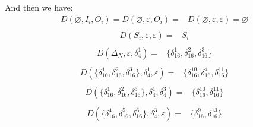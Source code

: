 \documentclass[conference]{IEEEtran} %
\begin{document}
And then we have:
\begin{equation}
\begin{split}
D\left(\varnothing,I_i,O_i\right)=D\left(\varnothing,\varepsilon,O_i\right)=&D\left(\varnothing,\varepsilon,\varepsilon\right)=\varnothing\\
\end{split}
\label{equ:7}
\end{equation}
\begin{equation}
\begin{split}
D\left(S_i,\varepsilon,\varepsilon\right)=&S_i\\
\end{split}
\label{equ:8}
\end{equation}
\begin{equation}
\begin{split}
D\left(\Delta_N,\varepsilon,\delta_4^1\right)=&\{\delta_{16}^1,\delta_{16}^2,\delta_{16}^3\}\\
\end{split}
\label{equ:9}
\end{equation}
\begin{equation}
\begin{split}
D\left(\{\delta_{16}^1,\delta_{16}^2,\delta_{16}^3\},\delta_4^1,\varepsilon\right)=&\{\delta_{16}^{10},\delta_{16}^4,\delta_{16}^{11}\}\\
\end{split}
\label{equ:10}
\end{equation}
\begin{equation}
\begin{split}
D\left(\{\delta_{16}^1,\delta_{16}^2,\delta_{16}^3\},\delta_4^1,\delta_4^3\right)=&\{\delta_{16}^{10},\delta_{16}^{11}\}\\
\end{split}
\label{equ:11}
\end{equation}
\begin{equation}
\begin{split}
D\left(\{\delta_{16}^4,\delta_{16}^5,\delta_{16}^6\},\delta_4^3,\varepsilon\right)=&\{\delta_{16}^9,\delta_{16}^{13}\}
\end{split}
\label{equ:12}
\end{equation}
\end{document}
